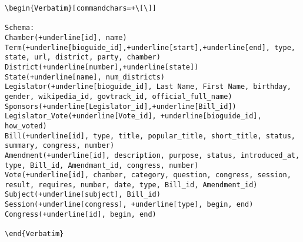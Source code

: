 \documentclass{article}
\begin{document}
\begin{lstlisting}
\begin{Verbatim}[commandchars=+\[\]]

Schema:
Chamber(+underline[id], name)
Term(+underline[bioguide_id],+underline[start],+underline[end], type, state, url, district, party, chamber)
District(+underline[number],+underline[state])
State(+underline[name], num_districts)
Legislator(+underline[bioguide_id], Last Name, First Name, birthday, gender, wikipedia_id, govtrack_id, official_full_name)
Sponsors(+underline[Legislator_id],+underline[Bill_id])
Legislator_Vote(+underline[Vote_id], +underline[bioguide_id], how_voted)
Bill(+underline[id], type, title, popular_title, short_title, status, summary, congress, number)
Amendment(+underline[id], description, purpose, status, introduced_at, type, Bill_id, Amendmant_id, congress, number)
Vote(+underline[id], chamber, category, question, congress, session, result, requires, number, date, type, Bill_id, Amendment_id)
Subject(+underline[subject], Bill_id)
Session(+underline[congress], +underline[type], begin, end)
Congress(+underline[id], begin, end)

\end{Verbatim}
\end{lstlisting}
\end{document}
